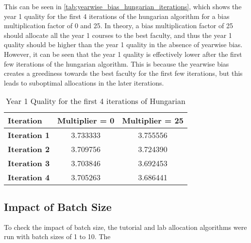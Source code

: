 This can be seen in \autoref{tab:yearwise_bias_hungarian_iterations}, which shows the year 1 quality for the first 4 iterations of the hungarian algorithm for a bias multiplication factor of 0 and 25. In theory, a bias multiplication factor of 25 should allocate all the year 1 courses to the best faculty, and thus the year 1 quality should be higher than the year 1 quality in the absence of yearwise bias. However, it can be seen that the year 1 quality is effectively lower after the first few iterations of the hungarian algorithm. This is because the yearwise bias creates a greediness towards the best faculty for the first few iterations, but this leads to suboptimal allocations in the later iterations.

\begin{table}[H]
  \centering
  \begin{tabular}{|l|c|c|}
    \hline
    \textbf{Iteration}   & \textbf{Multiplier = 0} & \textbf{Multiplier = 25} \\ \hline
    \textbf{Iteration 1} & 3.733333                & 3.755556                 \\ \hline
    \textbf{Iteration 2} & 3.709756                & 3.724390                 \\ \hline
    \textbf{Iteration 3} & 3.703846                & 3.692453                 \\ \hline
    \textbf{Iteration 4} & 3.705263                & 3.686441                 \\ \hline
  \end{tabular}
  \caption{Year 1 Quality for the first 4 iterations of Hungarian}
  \label{tab:yearwise_bias_hungarian_iterations}
\end{table}

\subsection{Impact of Batch Size}

To check the impact of batch size, the tutorial and lab allocation algorithms were run with batch sizes of 1 to 10. The

